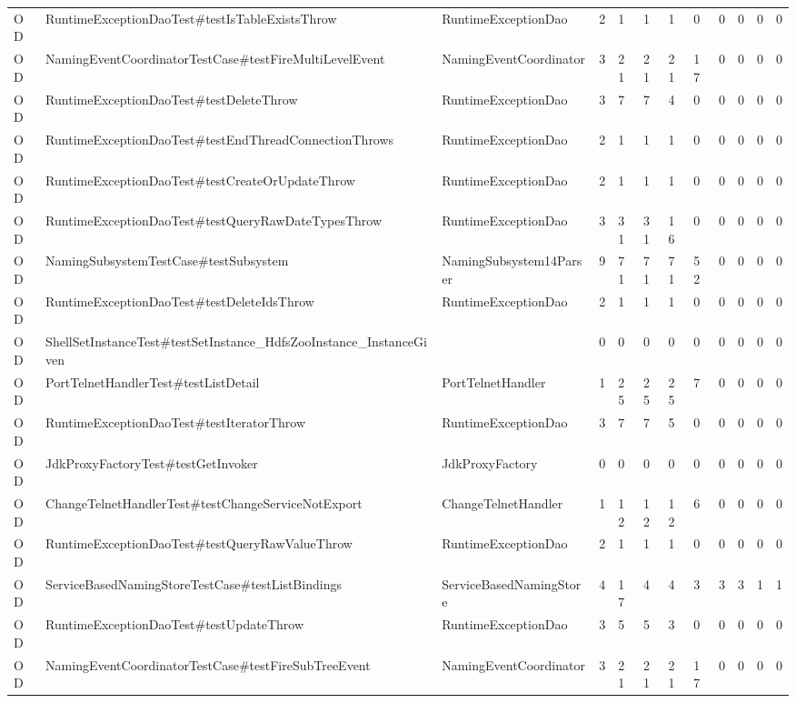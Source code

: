\begin{table}[t]
\begin{tabular}{llllllllllll}
OD & RuntimeExceptionDaoTest\#testIsTableExistsThrow & RuntimeExceptionDao & 2 & 1 & 1 & 1 & 0 & 0 & 0 & 0 & 0 \\
OD & NamingEventCoordinatorTestCase\#testFireMultiLevelEvent & NamingEventCoordinator & 3 & 21 & 21 & 21 & 17 & 0 & 0 & 0 & 0 \\
OD & RuntimeExceptionDaoTest\#testDeleteThrow & RuntimeExceptionDao & 3 & 7 & 7 & 4 & 0 & 0 & 0 & 0 & 0 \\
OD & RuntimeExceptionDaoTest\#testEndThreadConnectionThrows & RuntimeExceptionDao & 2 & 1 & 1 & 1 & 0 & 0 & 0 & 0 & 0 \\
OD & RuntimeExceptionDaoTest\#testCreateOrUpdateThrow & RuntimeExceptionDao & 2 & 1 & 1 & 1 & 0 & 0 & 0 & 0 & 0 \\
OD & RuntimeExceptionDaoTest\#testQueryRawDateTypesThrow & RuntimeExceptionDao & 3 & 31 & 31 & 16 & 0 & 0 & 0 & 0 & 0 \\
OD & NamingSubsystemTestCase\#testSubsystem & NamingSubsystem14Parser & 9 & 71 & 71 & 71 & 52 & 0 & 0 & 0 & 0 \\
OD & RuntimeExceptionDaoTest\#testDeleteIdsThrow & RuntimeExceptionDao & 2 & 1 & 1 & 1 & 0 & 0 & 0 & 0 & 0 \\
OD & ShellSetInstanceTest\#testSetInstance\_HdfsZooInstance\_InstanceGiven &  & 0 & 0 & 0 & 0 & 0 & 0 & 0 & 0 & 0 \\
OD & PortTelnetHandlerTest\#testListDetail & PortTelnetHandler & 1 & 25 & 25 & 25 & 7 & 0 & 0 & 0 & 0 \\
OD & RuntimeExceptionDaoTest\#testIteratorThrow & RuntimeExceptionDao & 3 & 7 & 7 & 5 & 0 & 0 & 0 & 0 & 0 \\
OD & JdkProxyFactoryTest\#testGetInvoker & JdkProxyFactory & 0 & 0 & 0 & 0 & 0 & 0 & 0 & 0 & 0 \\
OD & ChangeTelnetHandlerTest\#testChangeServiceNotExport & ChangeTelnetHandler & 1 & 12 & 12 & 12 & 6 & 0 & 0 & 0 & 0 \\
OD & RuntimeExceptionDaoTest\#testQueryRawValueThrow & RuntimeExceptionDao & 2 & 1 & 1 & 1 & 0 & 0 & 0 & 0 & 0 \\
OD & ServiceBasedNamingStoreTestCase\#testListBindings & ServiceBasedNamingStore & 4 & 17 & 4 & 4 & 3 & 3 & 3 & 1 & 1 \\
OD & RuntimeExceptionDaoTest\#testUpdateThrow & RuntimeExceptionDao & 3 & 5 & 5 & 3 & 0 & 0 & 0 & 0 & 0 \\
OD & NamingEventCoordinatorTestCase\#testFireSubTreeEvent & NamingEventCoordinator & 3 & 21 & 21 & 21 & 17 & 0 & 0 & 0 & 0 \\

\end{tabular}
\end{table}
